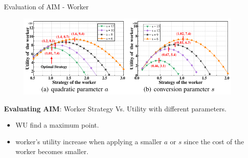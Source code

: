 \documentclass[aspectratio=169,xcolor=dvipsnames]{beamer}
\begin{document}
\begin{frame}[fragile]{Evaluation of AIM - Worker}
    \footnotesize %

    \begin{figure}
        \centering
        \includegraphics[width=0.8\linewidth]{Evaluation_AIM_Worker.png}
    \end{figure}
    
    \textbf{Evaluating AIM}: Worker Strategy Vs. Utility with different parameters.
    
    \begin{itemize}
        \item WU find a maximum point.
        \item worker’s utility increase when applying a smaller $a$ or $s$ since the cost of the
        worker becomes smaller.
    \end{itemize}
\end{frame}
\end{document}
